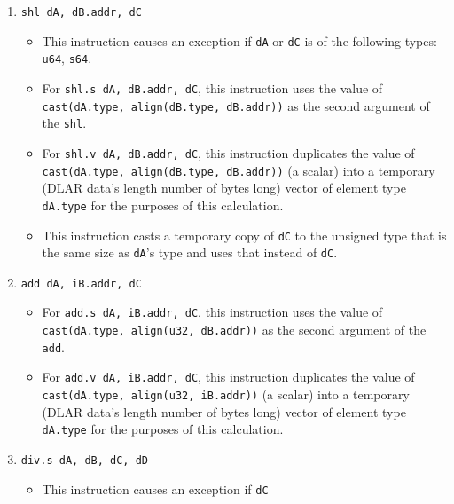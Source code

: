 \documentclass{article}
\begin{document}
\begin{itemize}
\begin{enumerate}
			\item \texttt{shl dA, dB.addr, dC}
				\begin{itemize}
				\item This instruction causes an exception if \texttt{dA}
					or \texttt{dC} is of the following types: \texttt{u64},
					\texttt{s64}.
				\item For \texttt{shl.s dA, dB.addr, dC}, this instruction
					uses the value of
					\texttt{cast(dA.type, align(dB.type, dB.addr))}
					as the second argument of the \texttt{shl}.
				\item For \texttt{shl.v dA, dB.addr, dC}, this instruction
					duplicates the value of
					\texttt{cast(dA.type, align(dB.type, dB.addr))}
					(a scalar) into a temporary (DLAR data's length number
					of bytes long) vector of element type \texttt{dA.type}
					for the purposes of this calculation.
				\item This instruction casts a temporary copy of
					\texttt{dC} to the unsigned type that is the same size
					as \texttt{dA}'s type and uses that instead of
					\texttt{dC}.
				\end{itemize}
			\item \texttt{add dA, iB.addr, dC}
				\begin{itemize}
				\item For \texttt{add.s dA, iB.addr, dC}, this instruction
					uses the value of
					\texttt{cast(dA.type, align(u32, dB.addr))}
					as the second argument of the \texttt{add}.
				\item For \texttt{add.v dA, iB.addr, dC}, this instruction
					duplicates the value of
					\texttt{cast(dA.type, align(u32, iB.addr))}
					(a scalar) into a temporary (DLAR data's length number
					of bytes long) vector of element type \texttt{dA.type}
					for the purposes of this calculation.
				\end{itemize}
			\item \texttt{div.s dA, dB, dC, dD}
				\begin{itemize}
				\item This instruction causes an exception if \texttt{dC}

\end{itemize}
\end{enumerate}
\end{itemize}
\end{document}
